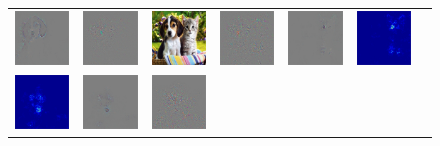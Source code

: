 \begin{figure}
\begin{center}
\begin{tabular}{ccccccc}
\includegraphics[width=0.13\linewidth]{figs/examples/googlenet/soft/dog-cat2_diff_163} &
\includegraphics[width=0.13\linewidth]{figs/examples/googlenet/oxford/dog-cat2_diff_163} &
\includegraphics[width=0.13\linewidth]{figs/examples/googlenet/oxford/dog-cat2} &
\includegraphics[width=0.13\linewidth]{figs/examples/googlenet/oxford/dog-cat2_diff_286} &
\includegraphics[width=0.13\linewidth]{figs/examples/googlenet/soft/dog-cat2_diff_286} &
\includegraphics[width=0.13\linewidth]{figs/examples/googlenet/soft/dog-cat2_sali_286} \\
\includegraphics[width=0.13\linewidth]{figs/examples/googlenet/soft/dog-cat3_sali_188} &
\includegraphics[width=0.13\linewidth]{figs/examples/googlenet/soft/dog-cat3_diff_188} &
\includegraphics[width=0.13\linewidth]{figs/examples/googlenet/oxford/dog-cat3_diff_188} &

\end{tabular}
\end{center}
\end{figure}
